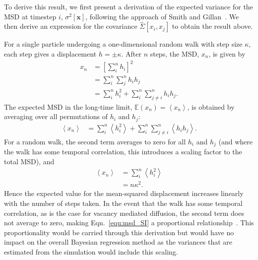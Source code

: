 \documentclass[reprint,superscriptaddress,nobibnotes,amsmath,amssymb,aps,prx,hidelinks,linenumbers]{revtex4-2}
\newcommand{\oMSD}{\ensuremath{\bm{x}}}
\newcommand{\oMSDi}{\ensuremath{x_i}}
\newcommand{\oMSDj}{\ensuremath{x_j}}
\newcommand{\oMSDn}{\ensuremath{x_n}}
\newcommand{\moMSDn}{\ensuremath{\left<\oMSDn\right>}}
\newcommand{\var}[1]{\ensuremath{\sigma^2[#1]}}
\begin{document}
To derive this result, we first present a derivation of the expected variance for the MSD at timestep $i$, $\var{\oMSD}$, following the approach of Smith and Gillan~\cite{smith_random_1996}.
We then derive an expression for the covariance $\widehat{\Sigma}\left[\oMSDi, \oMSDj\right]$ to obtain the result above.

For a single particle undergoing a one-dimensional random walk with step size $\kappa$, each step gives a displacement $h = \pm \kappa$.
After $n$ steps, the MSD, $\oMSDn$, is given by
\begin{equation}
  \begin{aligned}
    \oMSDn &= \left[\sum_i^n h_i\right]^2\\
           &= \sum_i^n\sum_j^n h_i h_j \\
           &= \sum_i^n h_i^2 + \sum_i^n\sum_{j\neq i}^n h_ih_j.
  \end{aligned}
\end{equation}
The expected MSD in the long-time limit, $\mathbb{E}(\oMSDn) = \moMSDn$, is obtained by averaging over all permutations of $h_i$ and $h_j$:
\begin{equation}
  \begin{aligned}
    \moMSDn &= \sum_i^n \left<h_i^2\right> + \sum_i^n\sum_{j\neq i}^n\left<h_i h_j\right>.
  \end{aligned}
\end{equation}
For a random walk, the second term averages to zero for all $h_i$ and $h_j$ (and where the walk has some temporal correlation, this introduces a scaling factor \cite{friauf_correlation_1962} to the total MSD), and
\begin{equation}
  \begin{aligned}
    \moMSDn &= \sum_i^n \left<h_i^2\right> \\
            &= n\kappa^2.
  \end{aligned}
  \label{equ:msd_SI}
\end{equation}
Hence the expected value for the mean-squared displacement increases linearly with the number of steps taken.
In the event that the walk has some temporal correlation, as is the case for vacancy mediated diffusion, the second term does not average to zero, making Eqn.~\ref{equ:msd_SI} a proportional relationship~\cite{friauf_correlation_1962}.
This proportionality would be carried through this derivation but would have no impact on the overall Bayesian regression method as the variances that are estimated from the simulation would include this scaling.  
\end{document}
